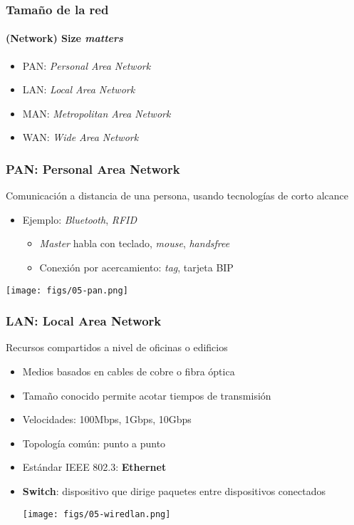 \documentclass[letter]{beamer}
\begin{document}
\begin{frame}
  \frametitle{Tamaño de la red}
  \framesubtitle{(Network) Size {\em matters}}

  \begin{itemize}
    \item PAN: {\em Personal Area Network}
    \item LAN: {\em Local Area Network}
    \item MAN: {\em Metropolitan Area Network}
    \item WAN: {\em Wide Area Network}
  \end{itemize}

\end{frame}
\begin{frame}
  \frametitle{PAN: Personal Area Network}

  Comunicación a distancia de una persona,
  usando tecnologías de corto alcance
  \begin{itemize}
    \item Ejemplo: {\em Bluetooth}, {\em RFID}
      \begin{itemize}
        \item {\em Master} habla con teclado, {\em mouse}, {\em handsfree}
        \item Conexión por acercamiento: {\em tag}, tarjeta BIP
      \end{itemize}
  \end{itemize}
  
  \begin{center}
    \texttt{[image: figs/05-pan.png]}
  \end{center}

\end{frame}

\begin{frame}
  \frametitle{LAN: Local Area Network}

  Recursos compartidos a nivel de oficinas o edificios

  \begin{itemize}
    \item Medios basados en cables de cobre o fibra óptica
    \item Tamaño conocido permite acotar tiempos de transmisión
    \item Velocidades: 100Mbps, 1Gbps, 10Gbps
    \item Topología común: punto a punto
    \item Estándar IEEE 802.3: {\bf Ethernet}
    \item {\bf Switch}: dispositivo que dirige paquetes entre dispositivos conectados
    
  \begin{center}
    \texttt{[image: figs/05-wiredlan.png]}
  \end{center}
    
  \end{itemize}

\end{frame}
\end{document}
